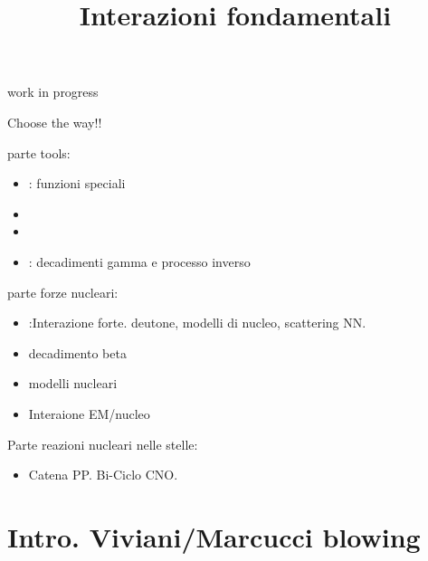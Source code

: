\documentclass[10pt,xcolor={usenames},fleqn,mathserif,serif]{beamer}
\title{Interazioni fondamentali}
\begin{document}

\begin{wordonframe}{work in progress}

Choose the way!!

parte tools:
    \begin{itemize}
        \item {}: funzioni speciali
        \item {} 
        \item {}
        \item {}: decadimenti gamma e processo inverso
    \end{itemize}

parte forze nucleari: 
    \begin{itemize}
    \item {}:Interazione forte. deutone, modelli di nucleo, scattering NN. 
    \item decadimento beta
    \item modelli nucleari
    \item Interaione EM/nucleo
    \end{itemize}
    
Parte reazioni nucleari nelle stelle:
\begin{itemize}
    \item Catena PP. Bi-Ciclo CNO.
    \end{itemize}

\end{wordonframe}

\begin{frame}
  \titlepage
  \tableofcontents[onlyparts]

\end{frame}


\part{Intro. Viviani/Marcucci blowing}

\end{document}

